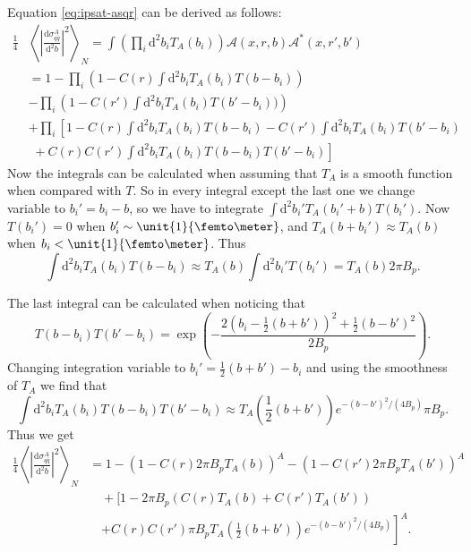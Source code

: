 \documentclass[a4paper,12pt]{article}
\newcommand{\der}{\mathrm{d}}
\newcommand{\A}{\mathcal{A}}
\begin{document}
Equation \eqref{eq:ipsat-asqr} can be derived as follows:
\begin{align*}
	\frac{1}{4}&\left \langle \left| \frac{\der \sigma_{q\bar q}^A}{\der^2 b} \right|^2 \right \rangle_N = \int \left(\prod_i \der^2 b_i T_A(b_i) \right) \A(x,r,b) \A^*(x,r',b') \\
	& = 1 - \prod_i \left(1 - C(r) \int \der^2 b_i T_A(b_i) T(b-b_i) \right) \\
	& - \prod_i \left(1- C(r') \int \der^2 b_i T_A(b_i) T(b'-b_i)) \right) \\
	& + \prod_i \left[ 1 - C(r) \int \der^2 b_i T_A(b_i) T(b-b_i) - C(r')\int \der^2 b_i T_A(b_i)T(b'-b_i)  \right. \\
	&\left. \,\, + C(r)C(r')\int \der^2 b_i T_A(b_i) T(b-b_i)T(b'-b_i) \right]
\end{align*}
Now the integrals can be calculated when assuming that $T_A$ is a smooth function when compared with $T$. So in every integral except the last one we change variable to $b_i'=b_i-b$, so we have to integrate $\int \der^2 b_i' T_A(b_i'+b) T(b_i')$. Now $T(b_i')=0$ when $b_i' \sim \unit{1}{\femto\meter}$, and $T_A(b+b_i')\approx T_A(b)$ when $b_i < \unit{1}{\femto\meter}$. Thus 
\begin{equation}
	\int \der^2 b_i T_A(b_i)T(b-b_i) \approx T_A(b) \int \der^2 b_i' T(b_i') = T_A(b)2\pi B_p.
\end{equation}

The last integral can be calculated when noticing that
\begin{equation}
	T(b-b_i)T(b'-b_i) = \exp\left( - \frac{2(b_i - \frac{1}{2}(b+b'))^2 + \frac{1}{2}(b-b')^2}{2B_p} \right).
\end{equation}
Changing integration variable to $b_i' = \frac{1}{2}(b+b')-b_i$ and using the smoothness of $T_A$ we find that
\begin{equation}
	\int \der^2 b_i T_A(b_i)T(b-b_i)T(b'-b_i) \approx T_A\left( \frac{1}{2}(b+b') \right) e^{-(b-b')^2/(4B_p)} \pi B_p.
\end{equation}
Thus we get
\begin{equation}
\begin{split}
	\frac{1}{4}\left \langle \left| \frac{\der \sigma_{q\bar q}^A}{\der^2 b} \right|^2 \right \rangle_N &= 1 - \left(1-C(r)2\pi B_p T_A(b)\right)^A - \left(1-C(r')2\pi B_p T_A(b') \right)^A \\
	&\quad +  \bigg[ 1 - 2\pi B_p(C(r)T_A(b)+C(r')T_A(b'))  \\
	&\quad \left. + C(r)C(r')\pi B_p T_A\left(\frac{1}{2}(b+b')\right) e^{-(b-b')^2/(4B_p)} \right]^A.
\end{split}
\end{equation}
\end{document}
